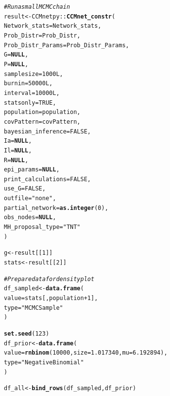 \documentclass{article}\usepackage[]{graphicx}\usepackage[]{xcolor}
\makeatletter
\newcommand{\hlnum}[1]{\textcolor[rgb]{0.686,0.059,0.569}{#1}}%
\newcommand{\hlsng}[1]{\textcolor[rgb]{0.192,0.494,0.8}{#1}}%
\newcommand{\hlcom}[1]{\textcolor[rgb]{0.678,0.584,0.686}{\textit{#1}}}%
\newcommand{\hlopt}[1]{\textcolor[rgb]{0,0,0}{#1}}%
\newcommand{\hldef}[1]{\textcolor[rgb]{0.345,0.345,0.345}{#1}}%
\newcommand{\hlkwa}[1]{\textcolor[rgb]{0.161,0.373,0.58}{\textbf{#1}}}%
\newcommand{\hlkwb}[1]{\textcolor[rgb]{0.69,0.353,0.396}{#1}}%
\newcommand{\hlkwc}[1]{\textcolor[rgb]{0.333,0.667,0.333}{#1}}%
\newcommand{\hlkwd}[1]{\textcolor[rgb]{0.737,0.353,0.396}{\textbf{#1}}}%
\newenvironment{kframe}{%
 \def\at@end@of@kframe{}%
 \ifinner\ifhmode%
  \def\at@end@of@kframe{\end{minipage}}%
  \begin{minipage}{\columnwidth}%
 \fi\fi%
 \def\FrameCommand##1{\hskip\@totalleftmargin \hskip-\fboxsep
 \colorbox{shadecolor}{##1}\hskip-\fboxsep
     \hskip-\linewidth \hskip-\@totalleftmargin \hskip\columnwidth}%
 \MakeFramed {\advance\hsize-\width
   \@totalleftmargin\z@ \linewidth\hsize
   \@setminipage}}%
 {\par\unskip\endMakeFramed%
 \at@end@of@kframe}
\makeatother
\begin{document}
\begin{kframe}
\begin{alltt}
\hlcom{# Run a small MCMC chain}
\hldef{result} \hlkwb{<-} \hldef{CCMnetpy}\hlopt{::}\hlkwd{CCMnet_constr}\hldef{(}
  \hlkwc{Network_stats}      \hldef{= Network_stats,}
  \hlkwc{Prob_Distr}         \hldef{= Prob_Distr,}
  \hlkwc{Prob_Distr_Params}  \hldef{= Prob_Distr_Params,}
  \hlkwc{G}\hldef{=}\hlkwa{NULL}\hldef{,}
  \hlkwc{P}\hldef{=}\hlkwa{NULL}\hldef{,}
  \hlkwc{samplesize}         \hldef{=} \hlnum{1000L}\hldef{,}
  \hlkwc{burnin}             \hldef{=} \hlnum{50000L}\hldef{,}
  \hlkwc{interval}           \hldef{=} \hlnum{10000L}\hldef{,}
  \hlkwc{statsonly}          \hldef{=} \hlnum{TRUE}\hldef{,}
  \hlkwc{population}         \hldef{= population,}
  \hlkwc{covPattern}         \hldef{= covPattern,}
  \hlkwc{bayesian_inference} \hldef{=} \hlnum{FALSE}\hldef{,}
  \hlkwc{Ia} \hldef{=} \hlkwa{NULL}\hldef{,}
  \hlkwc{Il} \hldef{=} \hlkwa{NULL}\hldef{,}
  \hlkwc{R} \hldef{=} \hlkwa{NULL}\hldef{,}
  \hlkwc{epi_params} \hldef{=} \hlkwa{NULL}\hldef{,}
  \hlkwc{print_calculations} \hldef{=} \hlnum{FALSE}\hldef{,}
  \hlkwc{use_G} \hldef{=} \hlnum{FALSE}\hldef{,}
  \hlkwc{outfile} \hldef{=} \hlsng{"none"}\hldef{,}
  \hlkwc{partial_network} \hldef{=} \hlkwd{as.integer}\hldef{(}\hlnum{0}\hldef{),}
  \hlkwc{obs_nodes} \hldef{=} \hlkwa{NULL}\hldef{,}
  \hlkwc{MH_proposal_type} \hldef{=} \hlsng{"TNT"}
\hldef{)}

\hldef{g}     \hlkwb{<-} \hldef{result[[}\hlnum{1}\hldef{]]}
\hldef{stats} \hlkwb{<-} \hldef{result[[}\hlnum{2}\hldef{]]}

\hlcom{# Prepare data for density plot}
\hldef{df_sampled} \hlkwb{<-} \hlkwd{data.frame}\hldef{(}
  \hlkwc{value} \hldef{= stats[,population} \hlopt{+} \hlnum{1}\hldef{],}
  \hlkwc{type}  \hldef{=} \hlsng{"MCMC Sample"}
\hldef{)}

\hlkwd{set.seed}\hldef{(}\hlnum{123}\hldef{)}
\hldef{df_prior} \hlkwb{<-} \hlkwd{data.frame}\hldef{(}
  \hlkwc{value} \hldef{=} \hlkwd{rnbinom}\hldef{(}\hlnum{10000}\hldef{,} \hlkwc{size} \hldef{=} \hlnum{1.017340}\hldef{,} \hlkwc{mu} \hldef{=} \hlnum{6.192894}\hldef{),}
  \hlkwc{type}  \hldef{=} \hlsng{"Negative Binomial"}
\hldef{)}

\hldef{df_all} \hlkwb{<-} \hlkwd{bind_rows}\hldef{(df_sampled, df_prior)}


\end{alltt}
\end{kframe}
\end{document}
